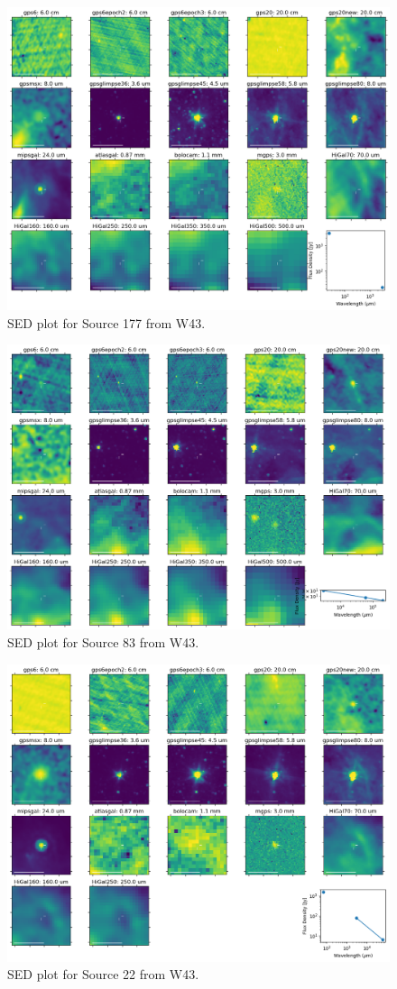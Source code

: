 \documentclass[twocolumn]{aastex62}
\begin{document}
\begin{figure}[htp]
    \includegraphics[width=17cm]{figures/SED_plot_G031_177.png}
\caption{SED plot for Source 177 from W43.}
\label{fig:sed177}
\end{figure}

\begin{figure}[htp]
    \includegraphics[width=17cm]{figures/SED_plot_G031_83.png}
\caption{SED plot for Source 83 from W43.}
\label{fig:sed83}
\end{figure}

\begin{figure}[htp]
    \includegraphics[width=17cm]{figures/SED_plot_G031_22.png}
\caption{SED plot for Source 22 from W43.}
\label{fig:sed22}
\end{figure}
\end{document}
